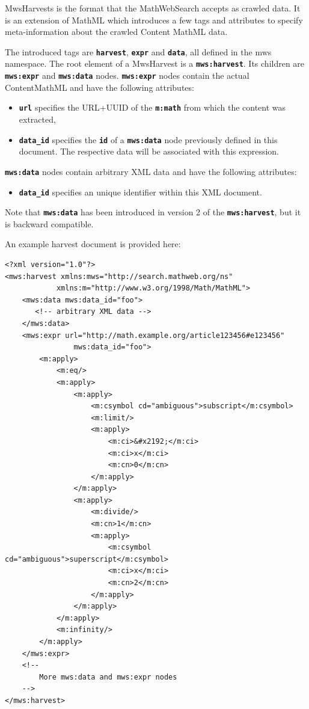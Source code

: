 \documentclass{deliverablereport}
\begin{document}
MwsHarvests is the format that the MathWebSearch accepts as crawled data. It is an
extension of MathML which introduces a few tags and attributes to specify meta-information
about the crawled Content MathML data.

The introduced tags are \textbf{\texttt{harvest}}, \textbf{\texttt{expr}} and
\textbf{\texttt{data}}, all defined in the mws namespace. The root element of a MwsHarvest
is a \textbf{\texttt{mws:harvest}}. Its children are \textbf{\texttt{mws:expr}} and
\textbf{\texttt{mws:data}} nodes. \textbf{\texttt{mws:expr}} nodes contain the actual
ContentMathML and have the following attributes:

\begin{itemize}
\item \textbf{\texttt{url}} specifies the URL+UUID of the \textbf{\texttt{m:math}} from
  which the content was extracted,
\item \textbf{\texttt{data\_id}} specifies the \textbf{\texttt{id}} of a
  \textbf{\texttt{mws:data}} node previously defined in this document. The respective data
  will be associated with this expression.
\end{itemize}

\textbf{\texttt{mws:data}} nodes contain arbitrary XML data and have the following
attributes:
\begin{itemize}
\item \textbf{\texttt{data\_id}} specifies an unique identifier within this XML document.
\end{itemize}

Note that \textbf{\texttt{mws:data}} has been introduced in version 2 of the
\textbf{\texttt{mws:harvest}}, but it is backward compatible.

An example harvest document is provided here:

\lstset{language=XML}
\begin{lstlisting}
<?xml version="1.0"?>
<mws:harvest xmlns:mws="http://search.mathweb.org/ns" 
			xmlns:m="http://www.w3.org/1998/Math/MathML">
    <mws:data mws:data_id="foo">
       <!-- arbitrary XML data -->
    </mws:data>
    <mws:expr url="http://math.example.org/article123456#e123456"
    			mws:data_id="foo">
        <m:apply>
            <m:eq/>
            <m:apply>
                <m:apply>
                    <m:csymbol cd="ambiguous">subscript</m:csymbol>
                    <m:limit/>
                    <m:apply>
                        <m:ci>&#x2192;</m:ci>
                        <m:ci>x</m:ci>
                        <m:cn>0</m:cn>
                    </m:apply>
                </m:apply>
                <m:apply>
                    <m:divide/>
                    <m:cn>1</m:cn>
                    <m:apply>
                        <m:csymbol cd="ambiguous">superscript</m:csymbol>
                        <m:ci>x</m:ci>
                        <m:cn>2</m:cn>
                    </m:apply>
                </m:apply>
            </m:apply>
            <m:infinity/>
        </m:apply>
    </mws:expr>
    <!--
        More mws:data and mws:expr nodes
    -->
</mws:harvest>
\end{lstlisting}
\end{document}
